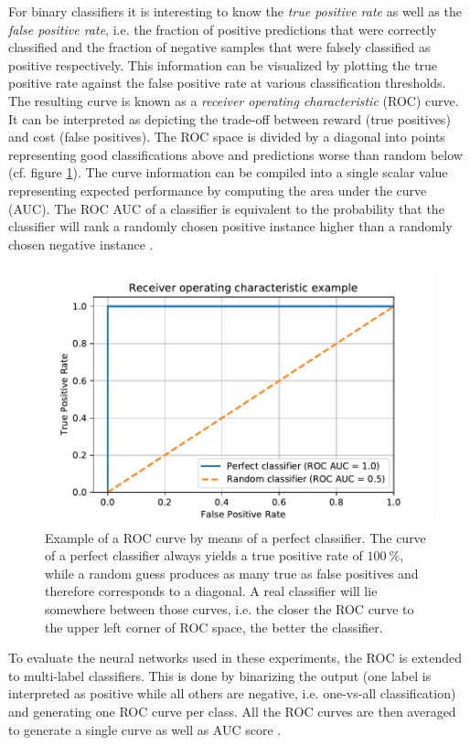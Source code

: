 For binary classifiers it is interesting to know the \emph{true positive rate} as well as the \emph{false positive rate}, i.e. the fraction of positive predictions that were correctly classified and the fraction of negative samples that were falsely classified as positive respectively. This information can be visualized by plotting the true positive rate against the false positive rate at various classification thresholds. The resulting curve is known as a \emph{receiver operating characteristic} (ROC) curve. It can be interpreted as depicting the trade-off between reward (true positives) and cost (false positives). The ROC space is divided by a diagonal into points representing good classifications above and predictions worse than random below (cf. figure \ref{fig:roc}). The curve information can be compiled into a single scalar value representing expected performance by computing the area under the curve (AUC). The ROC AUC of a classifier is equivalent to the probability that the classifier will rank a randomly chosen positive instance higher than a randomly chosen negative instance \cite{fawcett2006introduction}.
\begin{figure}[H]
    \centering
\includegraphics[clip,trim=0 0 0 1.1cm,width=.75\textwidth]{figures/roc.pdf}
\caption[Example of a ROC curve by means of a perfect classifier]{Example of a ROC curve by means of a perfect classifier. The curve of a perfect classifier always yields a true positive rate of $\SI{100}{\percent}$, while a random guess produces as many true as false positives and therefore corresponds to a diagonal. A real classifier will lie somewhere between those curves, i.e. the closer the ROC curve to the upper left corner of ROC space, the better the classifier.}\label{fig:roc}
\end{figure}\noindent
To evaluate the neural networks used in these experiments, the ROC is extended to multi-label classifiers. This is done by binarizing the output (one label is interpreted as positive while all others are negative, i.e. one-vs-all classification) and generating one ROC curve per class. All the ROC curves are then averaged to generate a single curve as well as AUC score \cite{provost2000well}.\newpage\noindent
